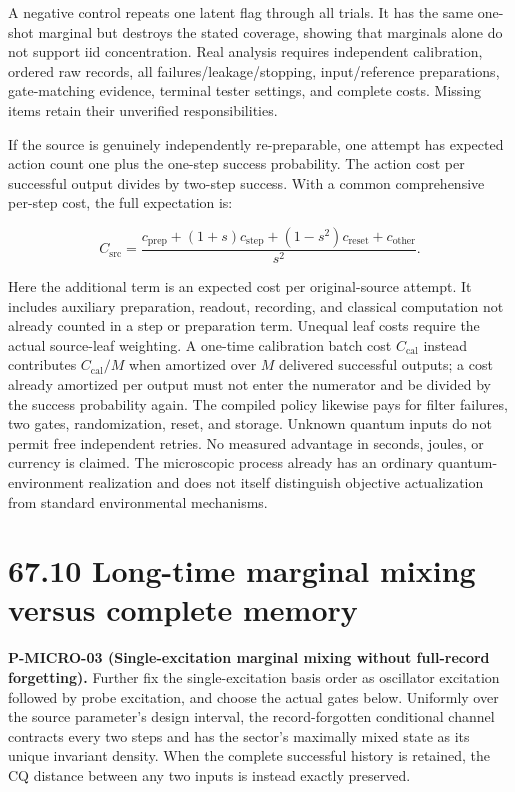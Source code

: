 \documentclass[
  11pt,
  oneside]{book}
\begin{document}
A negative control repeats one latent flag through all trials. It has
the same one-shot marginal but destroys the stated coverage, showing
that marginals alone do not support iid concentration. Real analysis
requires independent calibration, ordered raw records, all
failures/leakage/stopping, input/reference preparations, gate-matching
evidence, terminal tester settings, and complete costs. Missing items
retain their unverified responsibilities.

If the source is genuinely independently re-preparable, one attempt has
expected action count one plus the one-step success probability. The
action cost per successful output divides by two-step success. With a
common comprehensive per-step cost, the full expectation is:

\[
C_{\mathrm{src}}=
\frac{c_{\mathrm{prep}}+(1+s)c_{\mathrm{step}}+(1-s^2)c_{\mathrm{reset}}+c_{\mathrm{other}}}{s^2}.
\]

Here the additional term is an expected cost per original-source
attempt. It includes auxiliary preparation, readout, recording, and
classical computation not already counted in a step or preparation term.
Unequal leaf costs require the actual source-leaf weighting. A one-time
calibration batch cost \(C_{\mathrm{cal}}\) instead contributes
\(C_{\mathrm{cal}}/M\) when amortized over \(M\) delivered successful
outputs; a cost already amortized per output must not enter the
numerator and be divided by the success probability again. The compiled
policy likewise pays for filter failures, two gates, randomization,
reset, and storage. Unknown quantum inputs do not permit free
independent retries. No measured advantage in seconds, joules, or
currency is claimed. The microscopic process already has an ordinary
quantum-environment realization and does not itself distinguish
objective actualization from standard environmental mechanisms.

\section{67.10 Long-time marginal mixing versus complete memory}

\label{p-micro-03}{}

\textbf{P-MICRO-03 (Single-excitation marginal mixing without
full-record forgetting).} Further fix the single-excitation basis order
as oscillator excitation followed by probe excitation, and choose the
actual gates below. Uniformly over the source parameter's design
interval, the record-forgotten conditional channel contracts every two
steps and has the sector's maximally mixed state as its unique invariant
density. When the complete successful history is retained, the CQ
distance between any two inputs is instead exactly preserved.
\end{document}

